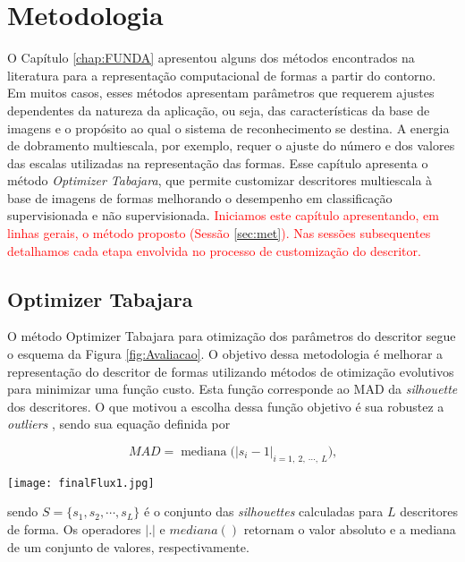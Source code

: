 \chapter{Metodologia}
\label{chap:MatMet}

O Capítulo \ref{chap:FUNDA} apresentou alguns dos métodos encontrados na literatura para a representação computacional de formas a partir do contorno.  Em muitos casos, esses métodos apresentam parâmetros que requerem ajustes dependentes da natureza da aplicação, ou seja,  das características da base de imagens e o propósito ao qual o sistema de reconhecimento se destina. A energia de dobramento multiescala, por exemplo, requer o ajuste do número e dos valores das escalas utilizadas na representação das formas. 
Esse capítulo apresenta o método \emph{Optimizer Tabajara}, que permite customizar descritores multiescala à base de imagens de formas melhorando o desempenho em classificação supervisionada e não supervisionada. 
\textcolor{red}{
Iniciamos este capítulo apresentando, em linhas gerais, o método proposto (Sessão \ref{sec:met}). Nas sessões subsequentes detalhamos cada etapa envolvida no processo de customização do descritor. 
}

\section{Optimizer Tabajara\label{sec:met}}
O método Optimizer Tabajara para otimização dos parâmetros do descritor segue o esquema da Figura \ref{fig:Avaliacao}. O objetivo dessa metodologia é melhorar a representação do descritor de formas utilizando métodos de otimização evolutivos para minimizar uma função custo. Esta função corresponde ao \ac{MAD} da \textit{silhouette} dos descritores. O que motivou a escolha dessa função objetivo é sua robustez a \textit{outliers} \cite{Rousseeuw:1987:2}, sendo sua equação definida por

\begin{equation}
\label{eq:mad}
MAD = \operatorname{mediana}\big(|s_i - 1|_{i =1,\:2,\:\cdots,\:L}\big)\text{,}
\end{equation}

\begin{figure*}[ht]
\caption{\label{fig:Avaliacao}
 Proposta de uma metodologia para otimização evolucionária de um descritor multiescala de forma.} 
\centering
\texttt{[image: finalFlux1.jpg]}
\end{figure*}

\noindent sendo $S = \{s_1,s_2,\cdots,s_L\}$ é o conjunto das \emph{silhouettes} calculadas para $L$ descritores de forma. Os operadores $|.|$  e {$mediana ( )$} retornam o valor absoluto e a mediana de um conjunto de valores, respectivamente.

